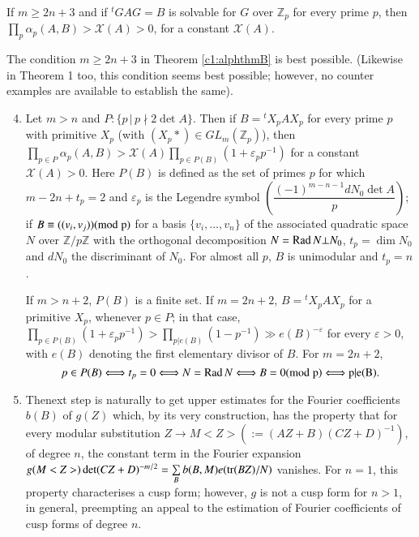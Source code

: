 \begin{alphtheorem}\label{c1:alphthmB}
If $m\geq 2n+3$ and if ${}^{t}GAG=B$ is solvable for $G$ over
$\mathbb{Z}_{p}$ for every prime $p$, then
$\prod\limits_{p}\alpha_{p}(A,B)>\mathscr{X}(A)>0$, for a constant
$\mathscr{X}(A)$. 
\end{alphtheorem}

\setcounter{remarks}{2}
\begin{remarks}\label{c1:rems3}
The condition $m\geq 2n+3$ in Theorem \ref{c1:alphthmB} is best
possible. (Likewise in Theorem 1 too, this condition seems best
possible; however, no counter examples are available to establish the same).
\end{remarks}

\begin{enumerate}
\setcounter{enumi}{3}
\item Let $m>n$ and $P:\{p \, | \,  p\nmid 2\det A\}$. Then if
  $B={}^{t}X_{p}AX_{p}$ for every prime $p$ with primitive $X_{p}$
  (\ie with $(X_{p}\ast)\in GL_{m}(\mathbb{Z}_{p})$), then
  $\prod\limits_{p\in
  P}\alpha_{p}(A,B)>\mathscr{X}(A)\prod\limits_{p\in
  P(B)}(1+\varepsilon_{p}p^{-1})$ for a constant
  $\mathscr{X}(A)>0$. Here 
  $P(B)$  is defined as the set of primes $p$ for which $m-2n+t_{p}=2$
  and $\varepsilon_{p}$ is the Legendre symbol
  $\left(\dfrac{(-1)^{m-n-1}dN_{0}\det A}{p}\right)$; if $B\equiv
  ((v_{i},v_{j}))(\rm{mod} \; p)$ for a basis $\{v_{i},\ldots,v_{n}\}$ of the
  associated quadratic space $N$ over $\mathbb{Z}/p\mathbb{Z}$ with
  the orthogonal decomposition $N=\operatorname{Rad} N\bot N_{0}$, $t_{p}=\dim
  N_{0}$ and $dN_{0}$ the discriminant of $N_{0}$. For almost all $p$,
  $B$ is unimodular and $t_{p}=n$.

If $m>n+2$, $P(B)$ is a finite set. If $m=2n+2$, $B={}^{t}X_{p}AX_{p}$
for a primitive $X_{p}$, whenever $p\in P$; in that case,
$\prod\limits_{p\in
  P(B)}(1+\varepsilon_{p}p^{-1})>\prod\limits_{p|e(B)}(1-p^{-1})\gg
e(B)^{-\varepsilon}$ for every $\varepsilon>0$, with $e(B)$ denoting the
first elementary divisor of $B$. For $m=2n+2$,
{\fontsize{9}{11}\selectfont
$$
p\in P(B)\Longleftrightarrow t_{p}=0\Longleftrightarrow N=\operatorname{Rad}
N\Longleftrightarrow B=0 (\rm{mod} \;  p)\Longleftrightarrow p|e(B).
$$}\relax

\item The\pageoriginale next step is naturally to get upper estimates
  for the Fourier coefficients $b(B)$ of $g(Z)$ which, by its very
  construction, has the property that for every modular substitution  
$Z\to M<Z>(:=(AZ+B)(CZ+D)^{-1})$, of degree $n$, the constant term in
  the Fourier expansion $g(M<Z>)\det
  (CZ+D)^{-m/2}=\sum\limits_{B}b(B,M)e(\operatorname{tr} (BZ)/N)$ vanishes. For
  $n=1$, this property characterises a cusp form; however, $g$ is not
  a cusp form for $n>1$, in general, preempting an appeal to the
  estimation of Fourier coefficients of cusp forms of degree $n$.
\end{enumerate}

